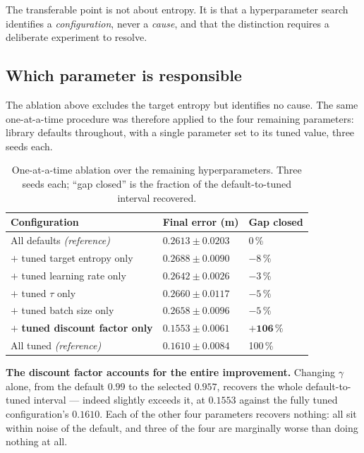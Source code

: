 The transferable point is not about entropy. It is that a hyperparameter search
identifies a \emph{configuration}, never a \emph{cause}, and that the distinction
requires a deliberate experiment to resolve.


\subsection{Which parameter is responsible}
\label{sec:ablation2}

The ablation above excludes the target entropy but identifies no cause. The same
one-at-a-time procedure was therefore applied to the four remaining parameters:
library defaults throughout, with a single parameter set to its tuned value,
three seeds each.

\begin{table}[H]
\centering
\caption{One-at-a-time ablation over the remaining hyperparameters. Three seeds
each; ``gap closed'' is the fraction of the default-to-tuned interval recovered.}
\begin{tabular}{@{} L{6.4cm} C{3.4cm} C{2.6cm} @{}}
\toprule
\textbf{Configuration} & \textbf{Final error (m)} & \textbf{Gap closed} \\
\midrule
All defaults \emph{(reference)} & $0.2613 \pm 0.0203$ & 0\,\% \\
$+$ tuned target entropy only & $0.2688 \pm 0.0090$ & $-8$\,\% \\
$+$ tuned learning rate only & $0.2642 \pm 0.0026$ & $-3$\,\% \\
$+$ tuned $\tau$ only & $0.2660 \pm 0.0117$ & $-5$\,\% \\
$+$ tuned batch size only & $0.2658 \pm 0.0096$ & $-5$\,\% \\
$\mathbf{+}$ \textbf{tuned discount factor only} & $\mathbf{0.1553 \pm 0.0061}$ & $\mathbf{+106}$\,\% \\
\midrule
All tuned \emph{(reference)} & $0.1610 \pm 0.0084$ & 100\,\% \\
\bottomrule
\end{tabular}
\label{tab:ablation2}
\end{table}

\textbf{The discount factor accounts for the entire improvement.} Changing
$\gamma$ alone, from the default $0.99$ to the selected $0.957$, recovers the
whole default-to-tuned interval --- indeed slightly exceeds it, at
$0.1553$ against the fully tuned configuration's $0.1610$. Each of the other four
parameters recovers nothing: all sit within noise of the default, and three of
the four are marginally worse than doing nothing at all.

